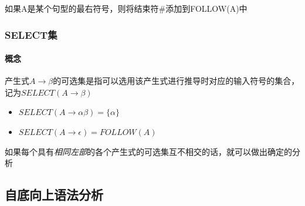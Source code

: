 \documentclass[UTF8]{ctexart} %
\begin{document}
如果A是某个句型的最右符号，则将结束符\#添加到FOLLOW(A)中

\subsubsection{SELECT集}

\paragraph{概念} 产生式$A\rightarrow \beta$的可选集是指可以选用该产生式进行推导时对应的输入符号的集合，记为$SELECT(A\rightarrow \beta)$

\begin{itemize}
    \item $SELECT(A\rightarrow \alpha\beta)=\{\alpha\}$
    \item $SELECT(A\rightarrow \epsilon)=FOLLOW(A)$
\end{itemize}

如果每个具有\emph{相同左部}的各个产生式的可选集互不相交的话，就可以做出确定的分析

\subsection{自底向上语法分析}
\end{document}
